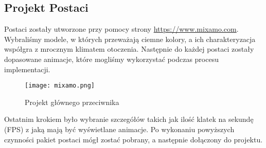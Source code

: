 \subsection{Projekt Postaci}
Postaci zostały utworzone przy pomocy strony \url{https://www.mixamo.com}. Wybraliśmy modele, w których przeważają ciemne kolory, a ich charakteryzacja współgra z mrocznym klimatem otoczenia. 
Następnie do każdej postaci zostały dopasowane animacje, które mogliśmy wykorzystać podczas procesu implementacji.
\begin{figure}[H]
	\center
	\texttt{[image: mixamo.png]}
	\caption{Projekt głównego przeciwnika}
\end{figure}
Ostatnim krokiem było wybranie szczegółów takich jak ilość klatek na sekundę (FPS) z jaką mają być wyświetlane animacje. 
Po wykonaniu powyższych czynności pakiet postaci mógł zostać pobrany, a następnie dołączony do projektu. 